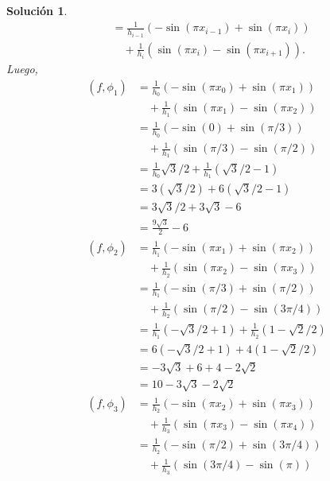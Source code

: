 \documentclass[11pt]{article}
\newtheorem*{sol}{Solución}
\newcommand\<{\langle}
\renewcommand\>{\rangle}
\begin{document}
\begin{sol}
\begin{align}
    &= 
      \frac{1}{h_{i-1}}
      (-\sin(\pi x_{i-1})+\sin(\pi x_i))
      \\
      &\quad
      +
      \frac{1}{h_{i}}
      (\sin(\pi x_i) -\sin(\pi x_{i+1}))
  .\end{align}
  Luego,
  \begin{align}
    (f,\phi_1)
      &= 
      \frac{1}{h_{0}}
      (- \sin(\pi x_{0})+\sin(\pi x_1))
      \\
      &\quad
      +
      \frac{1}{h_{1}}
      (\sin(\pi x_1) -\sin(\pi x_{2}))
    \\
      &= 
      \frac{1}{h_{0}} (-\sin(0) + \sin(\pi / 3))
      \\
      &\quad
      +
      \frac{1}{h_{1}}
      (\sin(\pi / 3) -\sin(\pi / 2))
    \\
      &= 
      \frac{1}{h_{0}} \sqrt{3}/2
      +
      \frac{1}{h_{1}} (\sqrt 3 / 2 - 1)
    \\
      &= 3(\sqrt{3}/2) + 6(\sqrt 3 / 2 - 1)
    \\
      &= 3\sqrt{3}/2 + 3\sqrt 3 - 6
    \\
      &= \frac{9\sqrt{3}}{2} - 6
    \\
    (f,\phi_2)
      &= 
      \frac{1}{h_{1}}
      (- \sin(\pi x_{1})+\sin(\pi x_2))
      \\
      &\quad
      +
      \frac{1}{h_{2}}
      (\sin(\pi x_2) -\sin(\pi x_{3}))
    \\
      &= 
      \frac{1}{h_{1}}
      (- \sin(\pi / 3)+\sin(\pi / 2))
      \\
      &\quad
      +
      \frac{1}{h_{2}}
      (\sin(\pi / 2) -\sin(3\pi / 4))
    \\
      &= 
      \frac{1}{h_{1}} (-\sqrt 3 / 2 + 1)
      +
      \frac{1}{h_{2}}
      (1 - \sqrt 2 / 2 )
    \\
      &= 
      6(-\sqrt 3 / 2 + 1)
      +
      4 (1 - \sqrt 2 / 2 )
    \\
      &= -3\sqrt 3 + 6 + 4 - 2\sqrt 2
    \\
      &= 10 -3\sqrt 3 -2\sqrt 2
    \\
    (f,\phi_3)
      &= 
      \frac{1}{h_{2}}
      (- \sin(\pi x_{2})+\sin(\pi x_3))
      \\
      &\quad
      +
      \frac{1}{h_{3}}
      (\sin(\pi x_3) -\sin(\pi x_{4}))
    \\
      &= 
      \frac{1}{h_{2}}
      (- \sin(\pi / 2)+\sin(3\pi / 4))
      \\
      &\quad
      +
      \frac{1}{h_{3}}
      (\sin(3\pi / 4) -\sin(\pi))

\end{align}
\end{sol}
\end{document}
